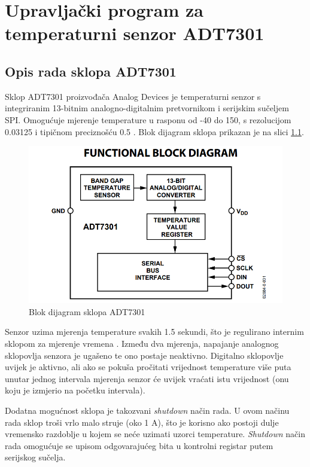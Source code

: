 \chapter{Upravljački program za temperaturni senzor ADT7301}

\section{Opis rada sklopa ADT7301}
	Sklop ADT7301 proizvođača Analog Devices je temperaturni senzor s integriranim 13-bitnim analogno-digitalnim pretvornikom i serijskim sučeljem SPI. Omogućuje mjerenje temperature u rasponu od -40\textcelsius{} do 150\textcelsius{}, s rezolucijom 0.03125\textcelsius{} i tipičnom preciznošću \textpm{} 0.5\textcelsius{} \cite{adt7301_datasheet}. Blok dijagram sklopa prikazan je na slici \ref{fig:adt7301_blok_dijagram}.
	
	\begin{figure}[htb]
		\centering
		\includegraphics{slike/ADT7301_blok_dijagram.png}
		\caption{Blok dijagram sklopa ADT7301}
		\label{fig:adt7301_blok_dijagram}
	\end{figure}

	Senzor uzima mjerenja temperature svakih 1.5 sekundi, što je regulirano internim sklopom za mjerenje vremena . Između dva mjerenja, napajanje analognog sklopovlja senzora je ugašeno te ono postaje neaktivno. Digitalno sklopovlje uvijek je aktivno, ali ako se pokuša pročitati vrijednost temperature više puta unutar jednog intervala mjerenja senzor će uvijek vraćati istu vrijednost (onu koju je izmjerio na početku intervala).
	
	Dodatna mogućnost sklopa je takozvani \textit{shutdown} način rada. U ovom načinu rada sklop troši vrlo malo struje (oko 1 \textmu{}A), što je korisno ako postoji dulje vremensko razdoblje u kojem se neće uzimati uzorci temperature. \textit{Shutdown} način rada omogućuje se upisom odgovarajućeg bita u kontrolni registar putem serijskog sučelja.
	
